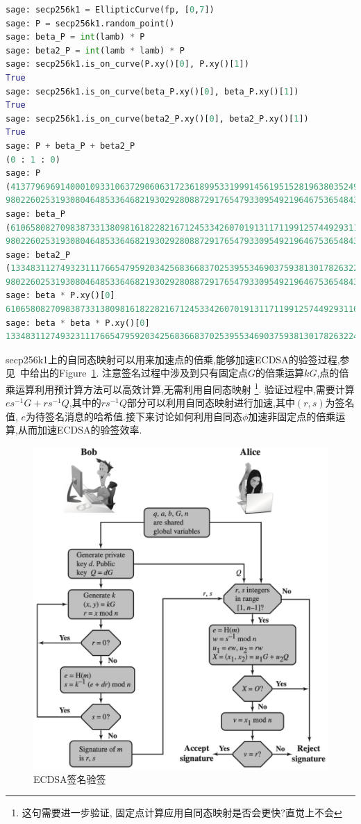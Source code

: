 \documentclass{article}
\begin{document}
\begin{lstlisting}[language=python, caption=\texttt{verify endomorphism $\phi$ with $\beta, \lambda$ for secp256k1}, label=lst-verifyphi]
sage: secp256k1 = EllipticCurve(fp, [0,7])
sage: P = secp256k1.random_point()
sage: beta_P = int(lamb) * P
sage: beta2_P = int(lamb * lamb) * P
sage: secp256k1.is_on_curve(P.xy()[0], P.xy()[1])
True
sage: secp256k1.is_on_curve(beta_P.xy()[0], beta_P.xy()[1])
True
sage: secp256k1.is_on_curve(beta2_P.xy()[0], beta2_P.xy()[1])
True
sage: P + beta_P + beta2_P
(0 : 1 : 0)
sage: P
(41377969691400010933106372906063172361899533199914561951528196380352494104025 : 
98022602531930804648533646821930292808872917654793309549219646753654843391634 : 1)
sage: beta_P
(61065808270983873313809816182282167124533426070191311711991257449293116444501 : 
98022602531930804648533646821930292808872917654793309549219646753654843391634 : 1)
sage: beta2_P
(13348311274932311176654795920342568366837025395534690375938130178263224123137 : 
98022602531930804648533646821930292808872917654793309549219646753654843391634 : 1)
sage: beta * P.xy()[0]
61065808270983873313809816182282167124533426070191311711991257449293116444501
sage: beta * beta * P.xy()[0]
13348311274932311176654795920342568366837025395534690375938130178263224123137
\end{lstlisting}

secp256k1上的自同态映射可以用来加速点的倍乘,能够加速ECDSA的验签过程,参见~\cite{stallings}中给出的Figure~\ref{fig-ecdsa}.
注意签名过程中涉及到只有固定点$G$的倍乘运算$kG$,点的倍乘运算利用预计算方法可以高效计算,无需利用自同态映射
\footnote{这句需要进一步验证, 固定点计算应用自同态映射是否会更快?直觉上不会}.
验证过程中,需要计算$es^{-1}G+rs^{-1}Q$,其中的$rs^{-1}Q$部分可以利用自同态映射进行加速,其中$(r,s)$为签名值,
$e$为待签名消息的哈希值.接下来讨论如何利用自同态$\phi$加速非固定点的倍乘运算,从而加速ECDSA的验签效率.

\begin{figure}[h]
\centering
\includegraphics[width=.8\textwidth]{ecdsa.png}
\caption{ECDSA签名验签}\label{fig-ecdsa}
\end{figure}
\end{document}
